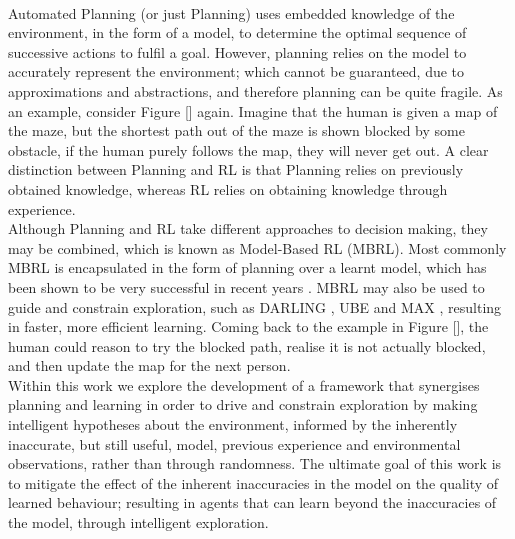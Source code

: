 \\Automated Planning (or just Planning) \cite{DBLP:books/aw/RN2020, Lav06} uses embedded knowledge of the environment, in the form of a model, to determine the optimal sequence of successive actions to fulfil a goal. However, planning relies on the model to accurately represent the environment; which cannot be guaranteed, due to approximations and abstractions, and therefore planning can be quite fragile. As an example, consider Figure [] again. Imagine that the human is given a map of the maze, but the shortest path out of the maze is shown blocked by some obstacle, if the human purely follows the map, they will never get out. A clear distinction between Planning and RL is that Planning relies on previously obtained knowledge, whereas RL relies on obtaining knowledge through experience.
\\Although Planning and RL take different approaches to decision making, they may be combined, which is known as Model-Based RL (MBRL). Most commonly MBRL is encapsulated in the form of planning over a learnt model, which has been shown to be very successful in recent years  \cite{silver2017mastering, pmlr-v28-levine13}. MBRL may also be used to guide and constrain exploration, such as DARLING \cite{AIJ16-leonetti}, UBE \cite{DBLP:journals/corr/abs-1709-05380} and MAX \cite{DBLP:journals/corr/abs-1810-12162}, resulting in faster, more efficient learning. Coming back to the example in Figure [], the human could reason to try the blocked path, realise it is not actually blocked, and then update the map for the next person.
\\Within this work we explore the development of a framework that synergises planning and learning in order to drive and constrain exploration by making intelligent hypotheses about the environment, informed by the inherently inaccurate, but still useful, model, previous experience and environmental observations, rather than through randomness. The ultimate goal of this work is to mitigate the effect of the inherent inaccuracies in the model on the quality of learned behaviour; resulting in agents that can learn beyond the inaccuracies of the model, through intelligent exploration.